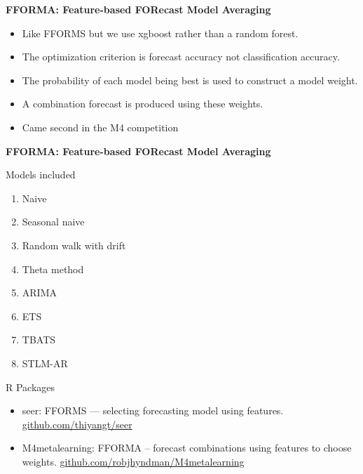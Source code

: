 \documentclass[14pt,ignorenonframetext,]{beamer}
\providecommand{\tightlist}{%
  \setlength{\itemsep}{0pt}\setlength{\parskip}{0pt}}
\begin{document}
\begin{frame}{\fontsize{15}{15}\sffamily\bfseries FFORMA: Feature-based FORecast Model Averaging}
\protect\hypertarget{section-1}{}

\begin{itemize}
\tightlist
\item
  Like FFORMS but we use xgboost rather than a random forest.
\item
  The optimization criterion is forecast accuracy not classification
  accuracy.
\item
  The probability of each model being best is used to construct a model
  weight.
\item
  A combination forecast is produced using these weights.
\item
  \alert{Came second in the M4 competition}
\end{itemize}

\end{frame}

\begin{frame}{\fontsize{15}{15}\sffamily\bfseries FFORMA: Feature-based FORecast Model Averaging}
\protect\hypertarget{section-2}{}

\begin{block}{Models included}

\begin{enumerate}
\tightlist
\item
  Naive
\item
  Seasonal naive
\item
  Random walk with drift
\item
  Theta method
\item
  ARIMA
\item
  ETS
\item
  TBATS
\item
  STLM-AR
\end{enumerate}

\end{block}

\end{frame}

\begin{frame}{R Packages}
\protect\hypertarget{r-packages}{}

\fontsize{14.5}{19}\sf

\begin{itemize}
\item
  \alert{seer}: FFORMS --- selecting forecasting model using features.
  \newline\url{github.com/thiyangt/seer}\vspace*{0.5cm}
\item
  \alert{M4metalearning}: FFORMA -- forecast combinations using features
  to choose weights. \newline\url{github.com/robjhyndman/M4metalearning}
\end{itemize}

\end{frame}
\end{document}
